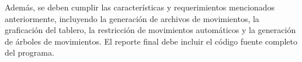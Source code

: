 Además, se deben cumplir las características y requerimientos mencionados anteriormente, incluyendo la generación de archivos de movimientos, la graficación del tablero, la restricción de movimientos automáticos y la generación de árboles de movimientos. El reporte final debe incluir el código fuente completo del programa.\newline